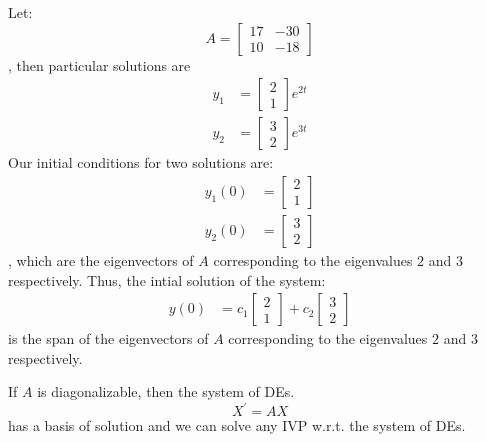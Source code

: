 \documentclass[11pt]{article}
\begin{document}
\begin{example}
    Let:
    $$
    A = \begin{bmatrix}
        17 & -30 \\
        10 & -18 
    \end{bmatrix}
    $$
    , then particular solutions are
    \begin{align*}
        y_1 &= \begin{bmatrix}
            2 \\ 1
        \end{bmatrix}e^{2 t} \\
        y_2 &= \begin{bmatrix}
            3 \\ 2
        \end{bmatrix}e^{3 t}
    \end{align*}
    Our initial conditions for two solutions are:
    \begin{align*}
        y_1(0) &= \begin{bmatrix}
            2 \\ 1
        \end{bmatrix} \\
        y_2(0) &= \begin{bmatrix}
            3 \\ 2
        \end{bmatrix}
    \end{align*}
    , which are the eigenvectors of $A$ corresponding to the eigenvalues $2$ and $3$ respectively. Thus, the intial solution of the system:
    \begin{align*}
        y(0) &= c_1\begin{bmatrix}
            2 \\ 1
        \end{bmatrix} + c_2\begin{bmatrix}
            3 \\ 2
        \end{bmatrix} 
    \end{align*}
    is the span of the eigenvectors of $A$ corresponding to the eigenvalues $2$ and $3$ respectively.
\end{example}
\begin{theorem}
    If $A$ is diagonalizable, then the system of DEs.
    \begin{equation}
        X^\prime = AX
    \end{equation}
    has a basis of solution and we can solve any IVP w.r.t. the system of DEs.
\end{theorem}
\subs
\end{document}
